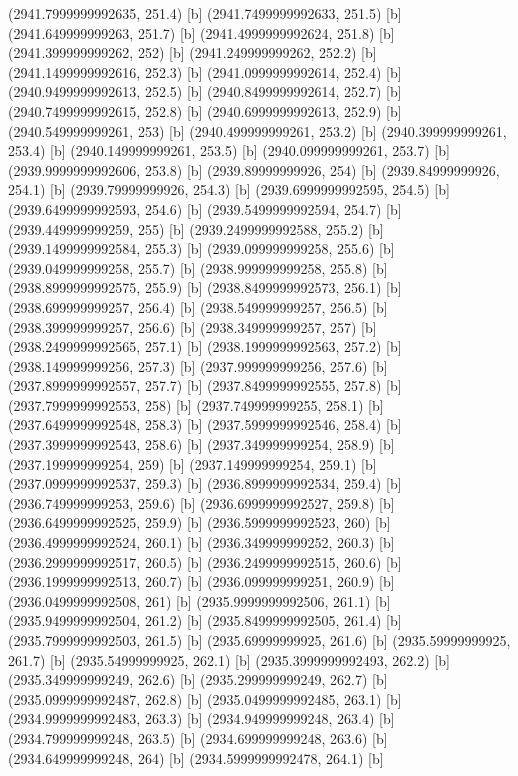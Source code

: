{{{(2941.7999999992635, 251.4) [b] 
(2941.7499999992633, 251.5) [b] 
(2941.649999999263, 251.7) [b] 
(2941.4999999992624, 251.8) [b] 
(2941.399999999262, 252) [b] 
(2941.249999999262, 252.2) [b] 
(2941.1499999992616, 252.3) [b] 
(2941.0999999992614, 252.4) [b] 
(2940.9499999992613, 252.5) [b] 
(2940.8499999992614, 252.7) [b] 
(2940.7499999992615, 252.8) [b] 
(2940.6999999992613, 252.9) [b] 
(2940.549999999261, 253) [b] 
(2940.499999999261, 253.2) [b] 
(2940.399999999261, 253.4) [b] 
(2940.149999999261, 253.5) [b] 
(2940.099999999261, 253.7) [b] 
(2939.9999999992606, 253.8) [b] 
(2939.89999999926, 254) [b] 
(2939.84999999926, 254.1) [b] 
(2939.79999999926, 254.3) [b] 
(2939.6999999992595, 254.5) [b] 
(2939.6499999992593, 254.6) [b] 
(2939.5499999992594, 254.7) [b] 
(2939.449999999259, 255) [b] 
(2939.2499999992588, 255.2) [b] 
(2939.1499999992584, 255.3) [b] 
(2939.099999999258, 255.6) [b] 
(2939.049999999258, 255.7) [b] 
(2938.999999999258, 255.8) [b] 
(2938.8999999992575, 255.9) [b] 
(2938.8499999992573, 256.1) [b] 
(2938.699999999257, 256.4) [b] 
(2938.549999999257, 256.5) [b] 
(2938.399999999257, 256.6) [b] 
(2938.349999999257, 257) [b] 
(2938.2499999992565, 257.1) [b] 
(2938.1999999992563, 257.2) [b] 
(2938.149999999256, 257.3) [b] 
(2937.999999999256, 257.6) [b] 
(2937.8999999992557, 257.7) [b] 
(2937.8499999992555, 257.8) [b] 
(2937.7999999992553, 258) [b] 
(2937.749999999255, 258.1) [b] 
(2937.6499999992548, 258.3) [b] 
(2937.5999999992546, 258.4) [b] 
(2937.3999999992543, 258.6) [b] 
(2937.349999999254, 258.9) [b] 
(2937.199999999254, 259) [b] 
(2937.149999999254, 259.1) [b] 
(2937.0999999992537, 259.3) [b] 
(2936.8999999992534, 259.4) [b] 
(2936.749999999253, 259.6) [b] 
(2936.6999999992527, 259.8) [b] 
(2936.6499999992525, 259.9) [b] 
(2936.5999999992523, 260) [b] 
(2936.4999999992524, 260.1) [b] 
(2936.349999999252, 260.3) [b] 
(2936.2999999992517, 260.5) [b] 
(2936.2499999992515, 260.6) [b] 
(2936.1999999992513, 260.7) [b] 
(2936.099999999251, 260.9) [b] 
(2936.0499999992508, 261) [b] 
(2935.9999999992506, 261.1) [b] 
(2935.9499999992504, 261.2) [b] 
(2935.8499999992505, 261.4) [b] 
(2935.7999999992503, 261.5) [b] 
(2935.69999999925, 261.6) [b] 
(2935.59999999925, 261.7) [b] 
(2935.54999999925, 262.1) [b] 
(2935.3999999992493, 262.2) [b] 
(2935.349999999249, 262.6) [b] 
(2935.299999999249, 262.7) [b] 
(2935.0999999992487, 262.8) [b] 
(2935.0499999992485, 263.1) [b] 
(2934.9999999992483, 263.3) [b] 
(2934.949999999248, 263.4) [b] 
(2934.799999999248, 263.5) [b] 
(2934.699999999248, 263.6) [b] 
(2934.649999999248, 264) [b] 
(2934.5999999992478, 264.1) [b] 
}}}
